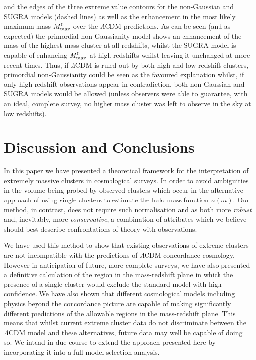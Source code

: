 \documentclass[twocolumn,useAMS,usenatbib,usegraphicx]{mn2e}
\newcommand{\lcdm}{$\Lambda$CDM }
\begin{document}
and the edges of the three extreme value contours for the
non-Gaussian and SUGRA models (dashed lines) as well as the
enhancement in the most likely maximum mass $M^0_{\rm max}$ over the \lcdm
predictions. As can be seen (and as expected) the primordial
non-Gaussianity model shows an enhancement of the mass of the
highest mass cluster at all redshifts, whilst the SUGRA model is
capable of enhancing $M^0_{\rm max}$ at high redshifts whilst leaving
it unchanged at more recent times. Thus, if \lcdm is ruled out by
both high and low redshift clusters, primordial non-Gaussianity
could be seen as the favoured explanation whilst, if only high
redshift observations appear in contradiction, both non-Gaussian and
SUGRA models would be allowed (unless observers were able to
guarantee, with an ideal, complete survey, no higher mass cluster
was left to observe in the sky at low redshifts).
\section{Discussion and Conclusions}
\label{sec:conclusions}
In this paper we have presented a theoretical framework for the interpretation of extremely massive clusters in cosmological surveys. In order to avoid ambiguities in the volume being probed by observed clusters which occur in the alternative approach of using single clusters to estimate the halo mass function $n(m)$. Our method, in contrast, does not require such normalisation and as both more \textit{robust} and, inevitably, more \textit{conservative}, a combination of attributes which we believe should best describe confrontations of theory with observations.

We have used this method to show that existing observations of extreme clusters are not incompatible with the predictions of \lcdm concordance cosmology. However in anticipation of future, more complete surveys, we have also presented a definitive calculation of the region in the mass-redshift plane in which the presence of a single cluster would exclude the standard model with high confidence. We have also shown that different cosmological models including physics beyond the concordance picture are capable of making significantly different predictions of the allowable regions in the mass-redshift plane. This means that whilst current extreme cluster data do not discriminate between the \lcdm model and these alternatives, future data may well be capable of doing so. We intend in due course to extend the approach presented here by incorporating it into a full model selection analysis.
\end{document}
